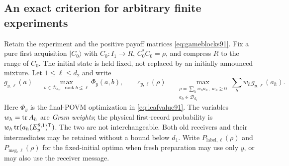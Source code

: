\subsection{An exact criterion for arbitrary finite experiments}
Retain the experiment and the positive payoff matrices
\eqref{eq:gameblocks91}.  Fix a pure first acquisition $|C_0\rangle$
with $C_0:I_1\to R$, $C_0^*C_0=\rho$, and compress $R$ to the range
of $C_0$.  The initial state is held fixed, not replaced by an initially
announced mixture.  Let $1\le\ell\le d_2$ and write
\[
 g_{y,\ell}(a)=
  \max_{b\in\mathcal D_{d_2},\ \operatorname{rank}b\le\ell}\Phi_y(a,b),
 \qquad
 c_{y,\ell}(\rho)=
  \max_{\substack{\rho=\sum_hw_ha_h\,,\ w_h\ge0\\a_h\in\mathcal D_{d_1}}}
                                      \sum_hw_hg_{y,\ell}(a_h).
\]
Here $\Phi_y$ is the final-POVM optimization in
\eqref{eq:leafvalue91}.  The variables $w_h=\operatorname{tr} A_h$ are
\emph{Gram weights}; the physical first-record probability is
$w_h\operatorname{tr}(a_h(E_y^{\theta,1})^{\mathsf T})$.  The two are not
interchangeable.  Both old receivers and their intermediates may be
retained without a bound below $d_1$.  Write
$P_{\mathrm{label},\ell}(\rho)$ and
$P_{\mathrm{msg},\ell}(\rho)$ for the fixed-initial optima when fresh
preparation may use only $y$, or may also use the receiver message.

